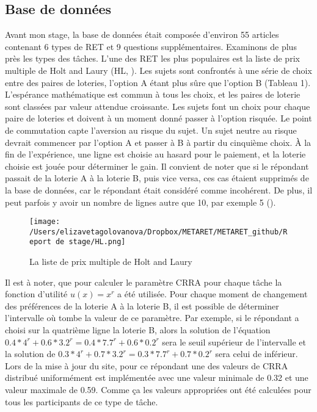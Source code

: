 \documentclass[12pt]{article}
\begin{document}
\subsection{Base de données}

Avant mon stage, la base de données était composée d'environ 55 articles
contenant 6 types de RET et 9 questions supplémentaires. Examinons de
plus près les types des tâches. L'une des RET les plus populaires est la
liste de prix multiple de Holt and Laury (HL, \citet{Holt2002}). Les
sujets sont confrontés à une série de choix entre des paires de
loteries, l'option A étant plus sûre que l'option B (Tableau 1).
L'espérance mathématique est commun à tous les choix, et les paires de
loterie sont classées par valeur attendue croissante. Les sujets font un
choix pour chaque paire de loteries et doivent à un moment donné passer
à l'option risquée. Le point de commutation capte l'aversion au risque
du sujet. Un sujet neutre au risque devrait commencer par l'option A et
passer à B à partir du cinquième choix. À la fin de l'expérience, une
ligne est choisie au hasard pour le paiement, et la loterie choisie est
jouée pour déterminer le gain. Il convient de noter que si le répondant
passait de la loterie A à la loterie B, puis vice versa, ces cas étaient
supprimés de la base de données, car le répondant était considéré comme
incohérent. De plus, il peut parfois y avoir un nombre de lignes autre
que 10, par exemple 5 (\citet{Branas_Garza2021}).

\begin{figure}
\centering
\texttt{[image: /Users/elizavetagolovanova/Dropbox/METARET/METARET\_github/Report de stage/HL.png]}
\caption{La liste de prix multiple de Holt and Laury}
\end{figure}

Il est à noter, que pour calculer le paramètre CRRA pour chaque tâche la
fonction d'utilité \(u(x) = x^r\) a été utilisée. Pour chaque moment de
changement des préférences de la loterie A à la loterie B, il est
possible de déterminer l'intervalle où tombe la valeur de ce paramètre.
Par exemple, si le répondant a choisi sur la quatrième ligne la loterie
B, alors la solution de l'équation
\(0.4*4^r + 0.6*3.2^r = 0.4*7.7^r + 0.6*0.2^r\) sera le seuil supérieur
de l'intervalle et la solution de
\(0.3*4^r + 0.7*3.2^r = 0.3*7.7^r + 0.7*0.2^r\) sera celui de inférieur.
Lors de la mise à jour du site, pour ce répondant une des valeurs de
CRRA distribué uniformément est implémentée avec une valeur minimale de
0.32 et une valeur maximale de 0.59. Comme ça les valeurs appropriées
ont été calculées pour tous les participants de ce type de tâche.
\end{document}
